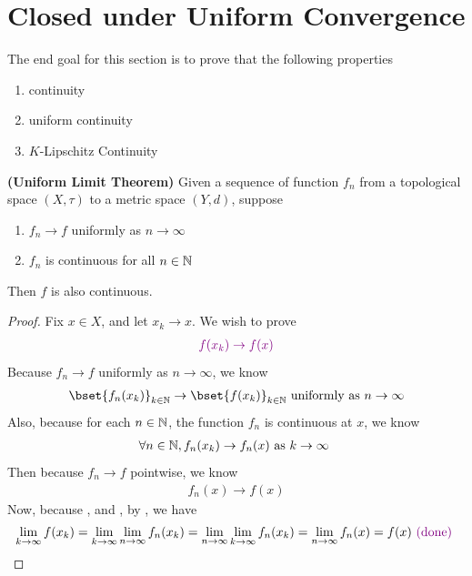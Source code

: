 \documentclass{report}
\begin{document}
\section{Closed under Uniform Convergence}
\label{UCaCH}
\begin{mdframed}
The end goal for this section is to prove that the following properties 
\begin{enumerate}[label=(\alph*)]
  \item continuity 
  \item uniform continuity 
  \item $K$-Lipschitz Continuity 
\end{enumerate}
\end{mdframed}
\begin{theorem}
\label{ULT}
\textbf{(Uniform Limit Theorem)} Given a sequence of function $f_n$ from a topological space $(X,\tau)$ to a metric space $(Y,d)$, suppose 
\begin{enumerate}[label=(\alph*)]
  \item $f_n\to f$ uniformly as $n\to \infty$
  \item $f_n$ is continuous for all  $n\in\mathbb{N}$ 
\end{enumerate}
Then $f$ is also continuous. 
\end{theorem}
\begin{proof}
Fix $x \in X$, and let $x_k\to x$. We wish to prove
\begin{align*}
  \textcolor{violet}{f(x_k)\to f(x)}
\end{align*}
Because $f_n\to f$ uniformly as $n\to \infty$, we know 
\begin{align}
\label{282e1}
\bset{f_n(x_k)}_{k\inn}\to \bset{f(x_k)}_{k\inn}\text{ uniformly as }n\to \infty
\end{align}
Also, because for each $n\in\mathbb{N}$, the function $f_n$ is continuous at $x$, we know 
\begin{align}
\label{282e2}
\forall n\in\mathbb{N}, f_n(x_k)\to f_n(x)\text{ as $k\to \infty$ }
\end{align}
Then because $f_n\to f$ pointwise, we know 
\begin{align}
\label{282e3}
f_n(x)\to f(x)
\end{align}
Now, because ,   and  , by , we have
\begin{align*}
\lim_{k\to \infty}f(x_k)=\lim_{k\to \infty}\lim_{n\to \infty}f_n(x_k)=\lim_{n\to \infty}\lim_{k\to \infty}f_n(x_k)=\lim_{n\to \infty}f_n(x)=f(x)\textcolor{violet}{\text{ (done) }}
\end{align*}
\end{proof}
\end{document}
